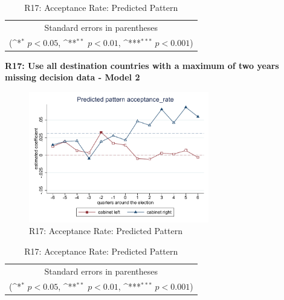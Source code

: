 \documentclass[10pt,a4paper]{scrartcl}
\begin{document}
\begin{table}[!ht]\centering
	\renewcommand{\arraystretch}{1.25}
	\def\sym#1{\ifmmode^{#1}\else\(^{#1}\)\fi}
	\caption{R17: Acceptance Rate: Predicted Pattern}
	\begin{tabular}{l*{2}{c}}
		\hline\hline
		
		\hline\hline
		\multicolumn{3}{c}{\footnotesize Standard errors in parentheses} \\
		\multicolumn{3}{c}{\footnotesize (\sym{*} \(p<0.05\), \sym{**} \(p<0.01\), \sym{***} \(p<0.001\))}\\
	\end{tabular}
\end{table}

\clearpage
\textbf{R17: Use all destination countries with a maximum of two years missing decision data - Model 2}
\begin{figure}[!ht]
	\centering
	\includegraphics[width=0.7\textwidth]{figures_edited/acceptance_rate_graph2_R17.pdf}
	\caption{R17: Acceptance Rate: Predicted Pattern}
\end{figure}

\begin{table}[!ht]\centering
	\footnotesize
	\renewcommand{\arraystretch}{1.15}
	\def\sym#1{\ifmmode^{#1}\else\(^{#1}\)\fi}
	\caption{R17: Acceptance Rate: Predicted Pattern}
	\begin{tabular}{l*{2}{c}}
		\hline\hline
		
		\hline\hline
		\multicolumn{3}{c}{\footnotesize Standard errors in parentheses} \\
		\multicolumn{3}{c}{\footnotesize (\sym{*} \(p<0.05\), \sym{**} \(p<0.01\), \sym{***} \(p<0.001\))} \\
	\end{tabular}
\end{table}
\end{document}
